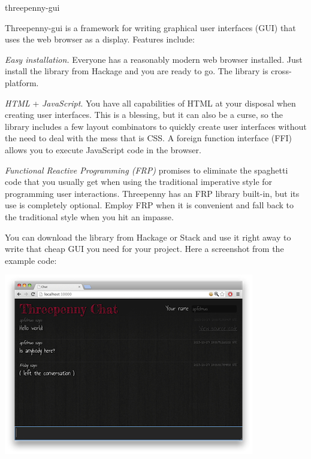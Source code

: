 \begin{hcarentry}[updated]{threepenny-gui}
\label{threepenny-gui}
\makeheader

Threepenny-gui is a framework for writing graphical user interfaces (GUI) that
uses the web browser as a display. Features include:

\begin{compactitem}
\item \emph{Easy installation.} Everyone has a reasonably modern web browser
  installed. Just install the library from Hackage and you are ready to go.
  The library is cross-platform.
\item \emph{HTML} + \emph{JavaScript}. You have all capabilities of HTML at
  your disposal when creating user interfaces. This is a blessing, but it can
  also be a curse, so the library includes a few layout combinators to quickly
  create user interfaces without the need to deal with the mess that is CSS. A
  foreign function interface (FFI) allows you to execute JavaScript code in
  the browser.
\item \emph{Functional Reactive Programming (FRP)} promises to eliminate the
  spaghetti code that you usually get when using the traditional imperative
  style for programming user interactions. Threepenny has an FRP library
  built-in, but its use is completely optional. Employ FRP when it is
  convenient and fall back to the traditional style when you hit an impasse.
\end{compactitem}

You can download the library from Hackage or Stack and use it right away to write that cheap GUI you need for your project. Here a screenshot from the example code:

\begin{center}
\includegraphics[width=\columnwidth]{html/chat.jpg}
\end{center}


\end{hcarentry}
